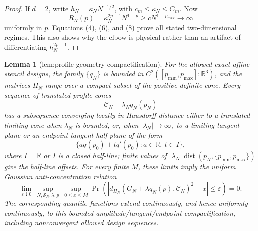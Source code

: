 \documentclass{article}
\newtheorem{lemma}{Lemma}
\begin{document}
\begin{proof}
If \(d=2\), write \(h_N=\kappa_NN^{-1/2}\), with \(c_m\le\kappa_N\le C_m\).  Now
\[
 R_N(p)=\kappa_N^{2p-1}N^{1-p}
 \ge cN^{1-p_{\max}}\longrightarrow\infty                                   \tag{8}
\]
uniformly in \(p\).  Equations (4), (6), and (8) prove all stated two-dimensional regimes.  This also shows why the elbow is physical rather than an artifact of differentiating \(h_N^{2p-1}\).
\end{proof}

\begin{lemma}[lem:profile-geometry-compactification]\label{lem:profile-geometry-compactification}
For the allowed exact affine-stencil designs, the family \(\{q_N\}\) is bounded in \(C^2([p_{\min},p_{\max}];\mathbb R^3)\), and the matrices \(H_N\) range over a compact subset of the positive-definite cone.  Every sequence of translated profile cones
\[
 \mathcal C_N-\lambda_Nq_N(p_N)
\]
has a subsequence converging locally in Hausdorff distance either to a translated limiting cone when \(\lambda_N\) is bounded, or, when \(|\lambda_N|\to\infty\), to a limiting tangent plane or an endpoint tangent half-plane of the form
\[
 \{a q(p_0)+tq'(p_0):a\in\mathbb R,\ t\in I\},
\]
where \(I=\mathbb R\) or \(I\) is a closed half-line; finite values of \(|\lambda_N|\operatorname{dist}(p_N,\{p_{\min},p_{\max}\})\) give the half-line offsets.  For every finite \(M\), these limits imply the uniform Gaussian anti-concentration relation
\[
 \lim_{\varepsilon\downarrow0}\ 
 \sup_{N,\mathcal S_N,\lambda,p}\ \sup_{0\le x\le M}
 \Pr\!\left(\left|d_{H_N}(G_N+\lambda q_N(p),\mathcal C_N)^2-x\right|
 \le\varepsilon\right)=0.                                                    \tag{9}
\]
The corresponding quantile functions extend continuously, and hence uniformly continuously, to this bounded-amplitude/tangent/endpoint compactification, including nonconvergent allowed design sequences.
\end{lemma}
\end{document}
